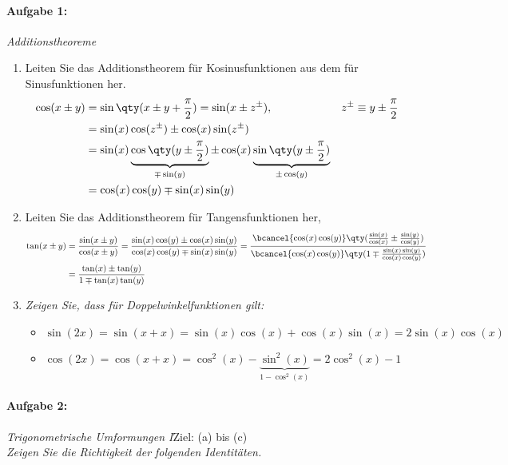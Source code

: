 \paragraph{Aufgabe 1: } \emph{Additionstheoreme}\\[-1em]
\begin{enumerate}[label=(\alph*)]
\item Leiten Sie das Additionstheorem für Kosinusfunktionen aus dem für Sinusfunktionen her.
\begin{align*}
    \cos(x\pm y)&=\sin\qty(x\pm y+\frac{\pi}{2})=\sin(x\pm z^{\pm}), && z^{\pm}\equiv y\pm\frac{\pi}{2}\\
    &=\sin(x)\cos(z^\pm)\pm\cos(x)\sin(z^\pm)\\
    &=\sin(x)\underbrace{\cos\qty(y\pm\frac{\pi}{2})}_{\mp\sin(y)}\pm\cos(x)\underbrace{\sin\qty(y\pm\frac{\pi}{2})}_{\pm\cos(y)}\\
    &=\cos(x)\cos(y)\mp\sin(x)\sin(y)
\end{align*} 
\item Leiten Sie das Additionstheorem für Tangensfunktionen her,
\begin{align*}
    \tan(x\pm y)&=\frac{\sin(x\pm y)}{\cos(x\pm y)}=\frac{\sin(x)\cos(y)\pm\cos(x)\sin(y)}{\cos(x)\cos(y)\mp\sin(x)\sin(y)}=\frac{\bcancel{\cos(x)\cos(y)}\qty(\frac{\sin(x)}{\cos(x)}\pm\frac{\sin(y)}{\cos(y)})}{\bcancel{\cos(x)\cos(y)}\qty(1\mp\frac{\sin(x)\sin(y)}{\cos(x)\cos(y)})}\\
    &=\frac{\tan(x)\pm\tan(y)}{1\mp\tan(x)\tan(y)}
    \end{align*}
\item \emph{Zeigen Sie, dass für Doppelwinkelfunktionen gilt:}
\begin{itemize}
    \item $\sin(2x)=\sin(x+x)=\sin(x)\cos(x)+\cos(x)\sin(x)=2\sin(x)\cos(x)$
    \item $\cos(2x)=\cos(x+x)=\cos^2(x)-\underbrace{\sin^2(x)}_{1-\cos^2(x)}=2\cos^2(x)-1$
\end{itemize}
\end{enumerate}

\paragraph{Aufgabe 2: } \emph{Trigonometrische Umformungen I}\hfill Ziel: (a) bis (c)\\[0.2cm]
\emph{Zeigen Sie die Richtigkeit der folgenden Identitäten.}

